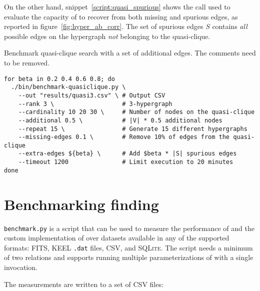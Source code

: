 On the other hand, snippet~\ref{script:quasi_spurious} shows the call used to evaluate
the capacity of \PresQ to recover from both missing and spurious edges, as reported in
figure~\ref{fig:hyper_ab_corr}. The set of spurious edges $S$ contains \emph{all} possible edges
on the hypergraph \emph{not} belonging to the quasi-clique.

\begin{code}
\caption[Benchmark quasi-clique search with a set of additional edges.]{Benchmark quasi-clique search with a set of additional edges. The comments need to be removed.}\label{script:quasi_spurious}
\begin{verbatim}
for beta in 0.2 0.4 0.6 0.8; do
  ./bin/benchmark-quasiclique.py \
    --out "results/quasi3.csv" \ # Output CSV
    --rank 3 \                   # 3-hypergraph
    --cardinality 10 20 30 \     # Number of nodes on the quasi-clique
    --additional 0.5 \           # |V| * 0.5 additional nodes
    --repeat 15 \                # Generate 15 different hypergraphs
    --missing-edges 0.1 \        # Remove 10% of edges from the quasi-clique
    --extra-edges ${beta} \      # Add $beta * |S| spurious edges
    --timeout 1200               # Limit execution to 20 minutes
done
\end{verbatim}
\end{code}

\section{Benchmarking  finding}

\texttt{benchmark.py} is a script that can be used to measure the performance of
\PresQ and the custom implementation of \Find over datasets available in any of
the supported formats: \gls{FITS}, \textsc{KEEL} \texttt{.dat} files, \gls{CSV},
and \textsc{SQLite}.
The script needs a minimum of two relations and supports running multiple
parameterizations of \PresQ with a single invocation.

The measurements are written to a set of \gls{CSV} files:

